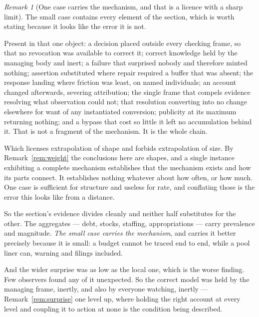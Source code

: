 \documentclass[11pt,a4paper]{article}
\theoremstyle{remark}
\newtheorem{remark}[definition]{Remark}
\begin{document}
\begin{remark}[One case carries the mechanism, and that is a licence with a sharp limit]\label{rem:anecdote}
The small case contains every element of the section, which is worth stating because it looks
like the error it is not.

Present in that one object: a decision placed outside every checking frame, so that no revocation was
available to correct it; correct knowledge held by the managing body and inert; a failure that surprised
nobody and therefore minted nothing; assertion substituted where repair required a buffer that was
absent; the response landing where friction was least, on named individuals; an account changed
afterwards, severing attribution; the single frame that compels evidence resolving what observation could
not; that resolution converting into no change elsewhere for want of any instantiated conversion;
publicity at its maximum returning nothing; and a bypass that cost so little it left no accumulation
behind it. That is not a fragment of the mechanism. It is the whole chain.

Which licenses extrapolation of shape and forbids extrapolation of size. By
Remark~\ref{rem:weight} the conclusions here are shapes, and a single instance exhibiting a complete
mechanism establishes that the mechanism exists and how its parts connect. It establishes nothing
whatever about how often, or how much. One case is sufficient for structure and useless for rate, and
conflating those is the error this looks like from a distance.

So the section's evidence divides cleanly and neither half substitutes for the other. The
aggregates --- debt, stocks, staffing, appropriations --- carry prevalence and magnitude. \emph{The small
case carries the mechanism}, and carries it better precisely because it is small: a budget cannot be
traced end to end, while a pool liner can, warning and filings included.

And the wider surprise was as low as the local one, which is the worse finding. Few observers
found any of it unexpected. So the correct model was held by the managing frame, inertly, and also
by everyone watching, inertly --- Remark~\ref{rem:surprise} one level up, where holding the right
account at every level and coupling it to action at none is the condition being described.
\end{remark}
\end{document}
